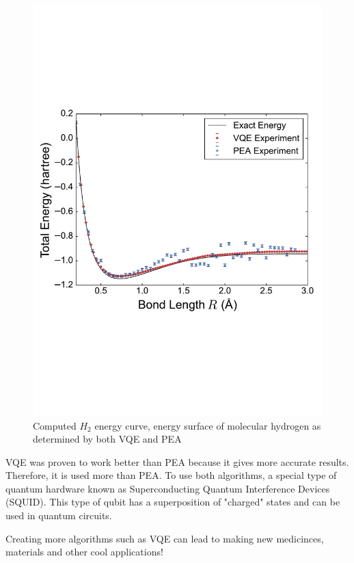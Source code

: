 \documentclass[14pt,landscape,color=UCLdarkred,margin=3cm]{uclposter}
\begin{document}
\begin{multicols}{3}
\begin{figure}[H]
  \begin{center}
  \includegraphics[scale=1.5]{result.pdf}
  \caption{Computed $H_2$ energy curve, energy surface of molecular hydrogen as determined by both VQE and PEA}
  \end{center}
    
 

   
\end{figure}

VQE was proven to work better than PEA because it gives more accurate results. Therefore, it is used more than PEA. To use both algorithms, a special type of quantum hardware known as Superconducting Quantum Interference Devices (SQUID). This type of qubit has a superposition of "charged" states and can be used in quantum circuits.

Creating more algorithms such as VQE can lead to making new medicinces, materials and other cool applications!


\end{multicols}
	
\end{document}
